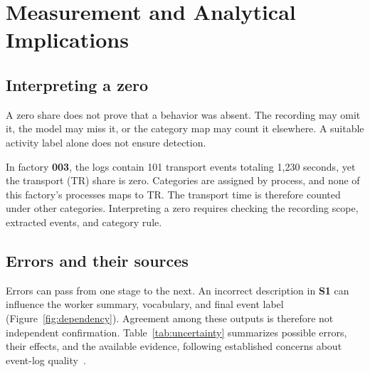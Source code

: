 \section{Measurement and Analytical Implications}
\label{sec:measurement}
\subsection{Interpreting a zero}
\label{sec:zeros}
A zero share does not prove that a behavior was absent. The recording may omit it, the model may miss it, or the category map may count it elsewhere. A suitable activity label alone does not ensure detection.

In factory \textbf{003}, the logs contain 101 transport events totaling 1{,}230 seconds, yet the transport (TR) share is zero. Categories are assigned by process, and none of this factory's processes maps to TR. The transport time is therefore counted under other categories. Interpreting a zero requires checking the recording scope, extracted events, and category rule.

\subsection{Errors and their sources}
\label{sec:uncertainty}
Errors can pass from one stage to the next. An incorrect description in \textbf{S1} can influence the worker summary, vocabulary, and final event label (Figure~\ref{fig:dependency}). Agreement among these outputs is therefore not independent confirmation. Table~\ref{tab:uncertainty} summarizes possible errors, their effects, and the available evidence, following established concerns about event-log quality~\cite{andrews2020quality,suriadi2017imperfections}.

